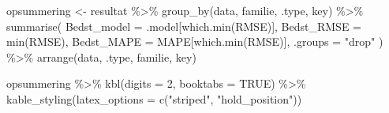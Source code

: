 \documentclass[
  danish,
]{article}
\newenvironment{Shaded}{\begin{snugshade}}{\end{snugshade}}
\newcommand{\AttributeTok}[1]{\textcolor[rgb]{0.40,0.45,0.13}{#1}}
\newcommand{\ConstantTok}[1]{\textcolor[rgb]{0.56,0.35,0.01}{#1}}
\newcommand{\DecValTok}[1]{\textcolor[rgb]{0.68,0.00,0.00}{#1}}
\newcommand{\FunctionTok}[1]{\textcolor[rgb]{0.28,0.35,0.67}{#1}}
\newcommand{\NormalTok}[1]{\textcolor[rgb]{0.00,0.23,0.31}{#1}}
\newcommand{\OtherTok}[1]{\textcolor[rgb]{0.00,0.23,0.31}{#1}}
\newcommand{\SpecialCharTok}[1]{\textcolor[rgb]{0.37,0.37,0.37}{#1}}
\newcommand{\StringTok}[1]{\textcolor[rgb]{0.13,0.47,0.30}{#1}}
\begin{document}
\begin{Shaded}
\begin{Highlighting}[]
\NormalTok{opsummering }\OtherTok{\textless{}{-}}\NormalTok{ resultat }\SpecialCharTok{\%\textgreater{}\%}
  \FunctionTok{group\_by}\NormalTok{(data, familie, .type, key) }\SpecialCharTok{\%\textgreater{}\%}
  \FunctionTok{summarise}\NormalTok{(}
    \AttributeTok{Bedst\_model    =}\NormalTok{ .model[}\FunctionTok{which.min}\NormalTok{(RMSE)],}
    \AttributeTok{Bedst\_RMSE     =} \FunctionTok{min}\NormalTok{(RMSE),}
    \AttributeTok{Bedst\_MAPE     =}\NormalTok{ MAPE[}\FunctionTok{which.min}\NormalTok{(RMSE)],}
    \AttributeTok{.groups =} \StringTok{"drop"}
\NormalTok{  ) }\SpecialCharTok{\%\textgreater{}\%}
  \FunctionTok{arrange}\NormalTok{(data, .type, familie, key)}

\NormalTok{opsummering }\SpecialCharTok{\%\textgreater{}\%}
  \FunctionTok{kbl}\NormalTok{(}\AttributeTok{digits =} \DecValTok{2}\NormalTok{, }\AttributeTok{booktabs =} \ConstantTok{TRUE}\NormalTok{) }\SpecialCharTok{\%\textgreater{}\%}
  \FunctionTok{kable\_styling}\NormalTok{(}\AttributeTok{latex\_options =} \FunctionTok{c}\NormalTok{(}\StringTok{"striped"}\NormalTok{, }\StringTok{"hold\_position"}\NormalTok{))}
\end{Highlighting}
\end{Shaded}
\end{document}
